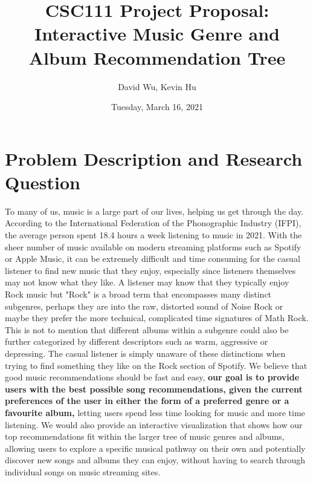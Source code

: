 \documentclass[fontsize=11pt]{article}
\title{CSC111 Project Proposal: Interactive Music Genre and Album Recommendation Tree}
\author{David Wu, Kevin Hu}
\date{Tuesday, March 16, 2021}
\begin{document}
\maketitle

\section*{Problem Description and Research Question}

To many of us, music is a large part of our lives, helping us get through the day. According to the International Federation of the Phonographic Industry (IFPI), the average person spent 18.4 hours a week listening to music in 2021. With the sheer number of music available on modern streaming platforms such as Spotify or Apple Music, it can be extremely difficult and time consuming for the casual listener to find new music that they enjoy, especially since listeners themselves may not know what they like. A listener may know that they typically enjoy Rock music but "Rock" is a broad term that encompasses many distinct subgenres, perhaps they are into the raw, distorted sound of Noise Rock or maybe they prefer the more technical, complicated time signatures of Math Rock. This is not to mention that different albums within a subgenre could also be further categorized by different descriptors such as warm, aggressive or depressing. The casual listener is simply unaware of these distinctions when trying to find something they like on the Rock section of Spotify. We believe that good music recommendations should be fast and easy, \textbf{our goal is to provide users with the best possible song recommendations, given the current preferences of the user in either the form of a preferred genre or a favourite album,} letting users spend less time looking for music and more time listening. We would also provide an interactive visualization that shows how our top recommendations fit within the larger tree of music genres and albums, allowing users to explore a specific musical pathway on their own and potentially discover new songs and albums they can enjoy, without having to search through individual songs on music streaming sites.
\end{document}

